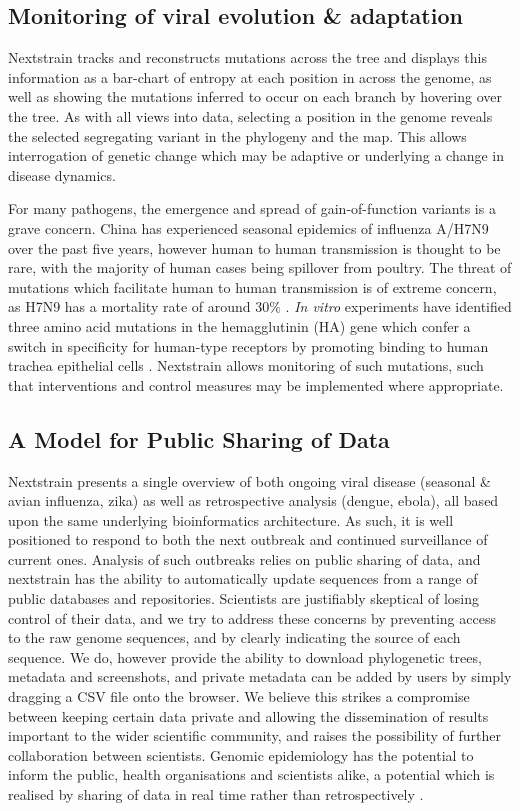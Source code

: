 \documentclass{bioinfo}
\begin{document}
\subsection*{Monitoring of viral evolution \& adaptation}
Nextstrain tracks and reconstructs mutations across the tree and displays this information as a bar-chart of entropy at each position in across the genome, as well as showing the mutations inferred to occur on each branch by hovering over the tree.
As with all views into data, selecting a position in the genome reveals the selected segregating variant in the phylogeny and the map.
This allows interrogation of genetic change which may be adaptive or underlying a change in disease dynamics.

For many pathogens, the emergence and spread of gain-of-function variants is a grave concern.
China has experienced seasonal epidemics of influenza A/H7N9 over the past five years, however human to human transmission is thought to be rare, with the majority of human cases being spillover from poultry.
The threat of mutations which facilitate human to human transmission is of extreme concern, as H7N9 has a mortality rate of around $30\%$ \citep{li2014epidemiology}.
\textit{In vitro} experiments have identified three amino acid mutations in the hemagglutinin (HA) gene which confer a switch in specificity for human-type receptors by promoting binding to human trachea epithelial cells \citep{devries2017three}.
Nextstrain allows monitoring of such mutations, such that interventions and control measures may be implemented where appropriate.


\subsection*{A Model for Public Sharing of Data}
Nextstrain presents a single overview of both ongoing viral disease (seasonal \& avian influenza, zika) as well as retrospective analysis (dengue, ebola), all based upon the same underlying bioinformatics architecture.
As such, it is well positioned to respond to both the next outbreak and continued surveillance of current ones.
Analysis of such outbreaks relies on public sharing of data, and nextstrain has the ability to automatically update sequences from a range of public databases and repositories.
Scientists are justifiably skeptical of losing control of their data, and we try to address these concerns by preventing access to the raw genome sequences, and by clearly indicating the source of each sequence.
We do, however provide the ability to download phylogenetic trees, metadata and screenshots, and private metadata can be added by users by simply dragging a CSV file onto the browser.
We believe this strikes a compromise between keeping certain data private and allowing the dissemination of results important to the wider scientific community, and raises the possibility of further collaboration between scientists.
Genomic epidemiology has the potential to inform the public, health organisations and scientists alike, a potential which is realised by sharing of data in real time rather than retrospectively \citep{croucher2015application}.
\end{document}
